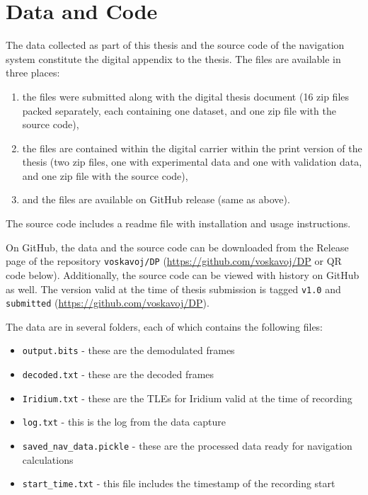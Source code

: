 \chapter{Data and Code}
The data collected as part of this thesis and the source code of the navigation system constitute the digital appendix to the thesis. The files are available in three places:
\begin{enumerate}
    \item the files were submitted along with the digital thesis document (16 zip files packed separately, each containing one dataset, and one zip file with the source code),
    \item the files are contained within the digital carrier within the print version of the thesis (two zip files, one with experimental data and one with validation data, and one zip file with the source code),
    \item and the files are available on GitHub release (same as above).
\end{enumerate}

The source code includes a readme file with installation and usage instructions.

On GitHub, the data and the source code can be downloaded from the Release page of the repository \texttt{voskavoj/DP} (\url{https://github.com/voskavoj/DP} or QR code below).  Additionally, the source code can be viewed with history on GitHub as well. The version valid at the time of thesis submission is tagged \texttt{v1.0} and \texttt{submitted} (\url{https://github.com/voskavoj/DP}). %

The data are in several folders, each of which contains the following files:
\begin{itemize}
    \item \texttt{output.bits} - these are the demodulated frames
    \item \texttt{decoded.txt} - these are the decoded frames 
    \item \texttt{Iridium.txt} - these are the TLEs for Iridium valid at the time of recording
    \item \texttt{log.txt} - this is the log from the data capture
    \item \texttt{saved\_nav\_data.pickle} - these are the processed data ready for navigation calculations
    \item \texttt{start\_time.txt} - this file includes the timestamp of the recording start
\end{itemize}
